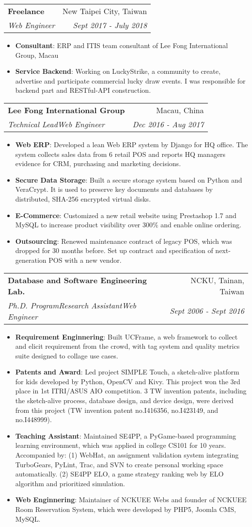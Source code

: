 \documentclass[a4paper,11pt]{article}
\makeatletter
\newcommand{\resumeItem}[2]{
  \item{
    \textbf{\small#1}{: \small#2 \vspace{-2pt}}
  }
}
\newcommand{\resumeSubheading}[4]{
  \vspace{-1pt}\item
    \begin{tabular*}{0.97\textwidth}{l@{\extracolsep{\fill}}r}
      \textbf{#1} & #2 \\
      \textit{#3} & \textit{ #4} \\
    \end{tabular*}\vspace{-5pt}
}
\newcommand{\resumeItemListStart}{\begin{itemize}}
\newcommand{\resumeItemListEnd}{\end{itemize}\vspace{-5pt}}
\newcommand\smalldiv{\smash{\raisebox{0.29ex}{\scalebox{0.8}{/}}}}
\makeatother
\begin{document}
    \resumeSubheading
      {Freelance}{New Taipei City, Taiwan}
      {Web Engineer}{Sept 2017 - July 2018}
      \resumeItemListStart
        \resumeItem{Consultant}
          {ERP and IT\smalldiv IS team consultant of Lee Fong International Group, Macau}
        \resumeItem{Service Backend}
          {Working on LuckyStrike, a community to create, advertise and participate commercial lucky draw events. I was responsible for backend part and RESTful-API construction.}
      \resumeItemListEnd

    \resumeSubheading
      {Lee Fong International Group}{Macau, China}
      {Technical Lead\smalldiv Web Engineer}{Dec 2016 - Aug 2017}
      \resumeItemListStart
        \resumeItem{Web ERP}
          {Developed a lean Web ERP system by Django for HQ office. The system collects sales data from 6 retail POS and reports HQ managers evidence for CRM, purchasing and marketing decisions.}
        \resumeItem{Secure Data Storage}
          {Built a secure storage system based on Python and VeraCrypt. It is used to preserve key documents and databases by distributed, SHA-256 encrypted virtual disks.}
        \resumeItem{E-Commerce}
          {Customized a new retail website using Prestashop 1.7 and MySQL to increase product visibility over 300\% and enable online ordering.}
        \resumeItem{Outsourcing}
          {Renewed maintenance contract of legacy POS, which was dropped for 30 months before. Set up contract and specification of next-generation POS with a new vendor.}
      \resumeItemListEnd

    \resumeSubheading
      {Database and Software Engineering Lab.}{NCKU, Tainan, Taiwan}
      {Ph.D. Program\smalldiv Research Assistant\smalldiv Web Engineer}{Sept 2006 - Sept 2016}
      \resumeItemListStart
        \resumeItem{Requirement Enginnering}
          {Built UCFrame, a web framework to collect and elicit requirement from the crowd, with tag system and quality metrics suite designed to collage use cases.}
        \resumeItem{Patents and Award}
          {Led project SIMPLE Touch, a sketch-alive platform for kids developed by Python, OpenCV and Kivy. This project won the 3rd place in 1st ITRI/ASUS AIO competition. 3 TW invention patents, including the sketch-alive process, database design, and device design, were derived from this project (TW invention patent no.I416356, no.I423149, and no.I448999).}
        \resumeItem{Teaching Assistant}
          {Maintained SE4PP, a PyGame-based programming learning environment, which was applied in college CS101 for 10 years. Accompanied by: (1) WebHat, an assignment validation system integrating TurboGears, PyLint, Trac, and SVN to create personal working space automatically. (2) SE4PP ELO, a game strategy ranking web by ELO algorithm and prioritized simulation.}
        \resumeItem{Web Enginnering}
          {Maintainer of NCKUEE Webs and founder of NCKUEE Room Reservation System, which were developed by PHP5, Joomla CMS, MySQL.}
      \resumeItemListEnd
\end{document}
